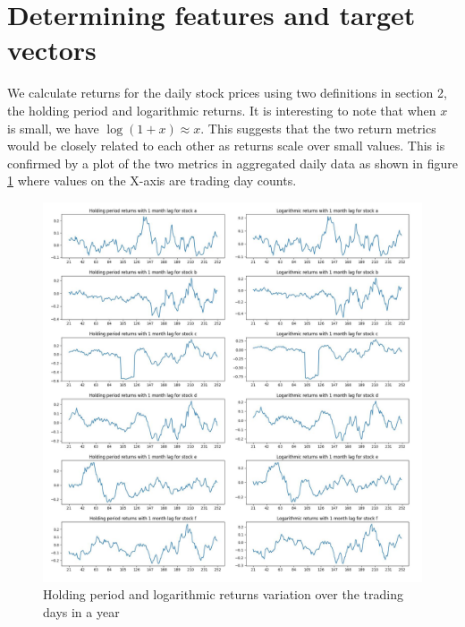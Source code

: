 \documentclass{article}
\begin{document}
\section{Determining features and target vectors}
We calculate returns for the daily stock prices using two definitions in section 2, the holding period and logarithmic returns. It is interesting to note that when $x$ is small, we have $\log(1+x)\approx x$. This suggests that the two return metrics would be closely related to each other as returns scale over small values. This is confirmed by a plot of the two metrics in aggregated daily data as shown in figure \ref{fig6} where values on the X-axis are trading day counts. 

\begin{figure}[htb]
	\centering
	\includegraphics[width=\textwidth]{monthly_returns.jpg}
	\caption{Holding period and logarithmic returns variation over the trading days in a year}
	\label{fig6}
\end{figure}
 
\end{document}
